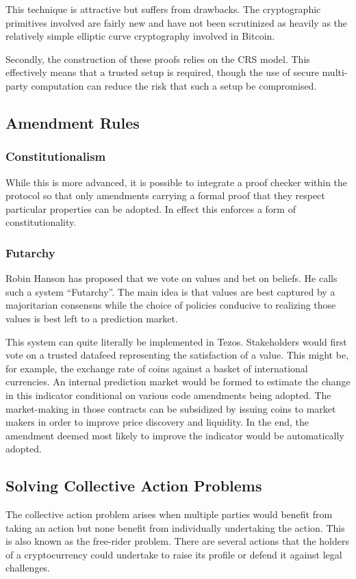 \documentclass[letterpaper]{article}
\begin{document}
This technique is attractive but suffers from drawbacks.
The cryptographic primitives involved are fairly new
and have not been scrutinized as heavily
as the relatively simple elliptic curve cryptography involved in Bitcoin.

Secondly, the construction of these proofs relies on the CRS model.
This effectively means that a trusted setup is required,
though the use of secure multi-party computation
can reduce the risk that such a setup be compromised.

\subsection{Amendment Rules}

\subsubsection{Constitutionalism}

While this is more advanced, it is possible to integrate a proof checker
within the protocol so that only amendments carrying a formal proof that
they respect particular properties can be adopted. In effect this enforces
a form of constitutionality.

\subsubsection{Futarchy}
Robin Hanson has proposed that we vote on values and bet on beliefs.
He calls such a system ``Futarchy''\cite{Futarchy}. The main idea
is that values are best captured by a majoritarian consensus while the choice
of policies conducive to realizing those values is best left to a prediction
market.

This system can quite literally be implemented in Tezos. Stakeholders would
first vote on a trusted datafeed representing the satisfaction of a value. 
This might be, for example, the exchange rate of coins against a basket 
of international currencies. An internal prediction market would be formed
to estimate the change in this indicator conditional on various code 
amendments being adopted. The market-making in those contracts can be
subsidized by issuing coins to market makers in order to improve price discovery
and liquidity. In the end, the amendment deemed most likely to improve the
indicator would be automatically adopted.

\subsection{Solving Collective Action Problems}
The collective action problem arises when multiple parties would benefit from
taking an action but none benefit from individually undertaking the action.
This is also known as the free-rider problem.
There are several actions that the holders of a cryptocurrency could undertake
to raise its profile or defend it against legal challenges.
\end{document}
